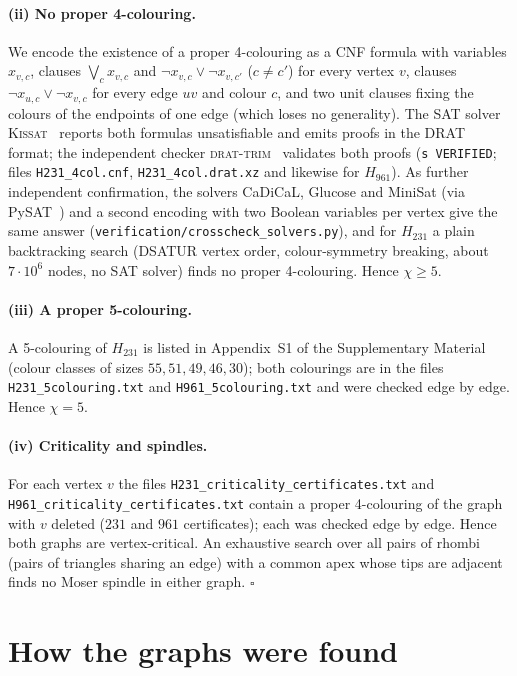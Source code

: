 \documentclass[11pt]{article}
\theoremstyle{remark}
\begin{document}
\paragraph{(ii) No proper 4-colouring.} We encode the existence of a proper 4-colouring as a CNF formula
with variables $x_{v,c}$, clauses $\bigvee_{c}x_{v,c}$ and $\neg x_{v,c}\vee\neg x_{v,c'}$ ($c\ne c'$)
for every vertex $v$, clauses $\neg x_{u,c}\vee\neg x_{v,c}$ for every edge $uv$ and colour $c$, and two
unit clauses fixing the colours of the endpoints of one edge (which loses no generality). The SAT solver
\textsc{Kissat}~\cite{Kissat} reports both formulas unsatisfiable and emits proofs in the DRAT format;
the independent checker \textsc{drat-trim}~\cite{WetzlerHeuleHunt2014} validates both proofs
(\texttt{s VERIFIED}; files \texttt{H231\_4col.cnf}, \texttt{H231\_4col.drat.xz} and likewise for $H_{961}$). As further independent confirmation, the solvers CaDiCaL, Glucose and MiniSat (via
PySAT~\cite{PySAT}) and a second encoding with two Boolean variables per vertex give the same answer
(\texttt{verification/crosscheck\_solvers.py}), and
for $H_{231}$ a plain backtracking search (DSATUR vertex order, colour-symmetry breaking, about
$7\cdot10^{6}$ nodes, no SAT solver) finds no proper 4-colouring. Hence $\chi\ge5$.

\paragraph{(iii) A proper 5-colouring.} A 5-colouring of $H_{231}$ is listed in Appendix~S1 of the Supplementary Material
(colour classes of sizes $55,51,49,46,30$); both colourings are in the files \texttt{H231\_5colouring.txt} and
\texttt{H961\_5colouring.txt} and were checked edge by edge. Hence $\chi=5$.

\paragraph{(iv) Criticality and spindles.} For each vertex $v$ the files
\texttt{H231\_criticality\_certificates.txt} and \texttt{H961\_criticality\_certificates.txt} contain a
proper 4-colouring of the graph with $v$ deleted ($231$ and $961$ certificates); each was checked edge by
edge. Hence both graphs are vertex-critical. An exhaustive search over all pairs of rhombi (pairs of triangles sharing an edge)
with a common apex whose tips are adjacent finds no Moser spindle in either graph. \hfill$\square$

\section{How the graphs were found}\label{sec:method}
\end{document}

